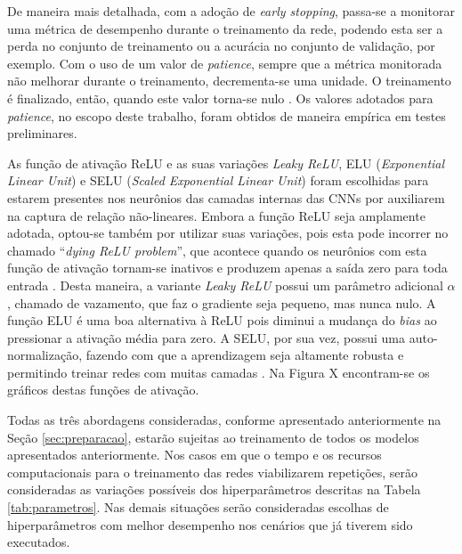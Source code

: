 De maneira mais detalhada, com a adoção de \emph{early stopping}, passa-se a monitorar uma métrica de desempenho durante o treinamento da rede, podendo esta ser a perda no conjunto de treinamento ou a acurácia no conjunto de validação, por exemplo. Com o uso de um valor de \emph{patience}, sempre que a métrica monitorada não melhorar durante o treinamento, decrementa-se uma unidade. O treinamento é finalizado, então, quando este valor torna-se nulo \cite{chollet}. Os valores adotados para \emph{patience}, no escopo deste trabalho, foram obtidos de maneira empírica em testes preliminares.




As função de ativação ReLU e as suas variações \emph{Leaky ReLU}, ELU (\emph{Exponential Linear Unit}) e SELU (\emph{Scaled Exponential Linear Unit}) foram escolhidas para estarem presentes nos neurônios das camadas internas das CNNs por auxiliarem na captura de relação não-lineares. Embora a função ReLU seja amplamente adotada, optou-se também por utilizar suas variações, pois esta pode incorrer no chamado ``\emph{dying ReLU problem}'', que acontece quando os neurônios com esta função de ativação tornam-se inativos e produzem apenas a saída zero para toda entrada \cite{reluDying}.  Desta maneira, a variante \emph{Leaky ReLU} possui um parâmetro adicional $\alpha$, chamado de vazamento, que faz o gradiente seja pequeno, mas nunca nulo. A função ELU é uma boa alternativa à ReLU pois diminui a mudança do \emph{bias} ao pressionar a ativação média para zero. A SELU, por sua vez, possui uma auto-normalização, fazendo com que a aprendizagem seja altamente robusta e permitindo treinar redes com muitas camadas \cite{relu}. Na Figura X encontram-se os gráficos destas funções de ativação.



Todas as três abordagens consideradas, conforme apresentado anteriormente na Seção \ref{sec:preparacao}, estarão sujeitas ao treinamento de todos os modelos apresentados anteriormente. Nos casos em que o tempo e os recursos computacionais para o treinamento das redes viabilizarem repetições, serão consideradas as variações possíveis dos hiperparâmetros descritas na Tabela \ref{tab:parametros}. Nas demais situações serão consideradas escolhas de hiperparâmetros com melhor desempenho nos cenários que já tiverem sido executados.
